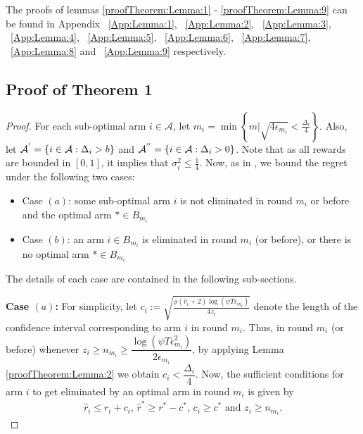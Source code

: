 The proofs of lemmas \ref{proofTheorem:Lemma:1} - \ref{proofTheorem:Lemma:9} can be found in Appendix ~\ref{App:Lemma:1}, ~\ref{App:Lemma:2}, ~\ref{App:Lemma:3}, ~\ref{App:Lemma:4}, ~\ref{App:Lemma:5}, ~\ref{App:Lemma:6}, ~\ref{App:Lemma:7}, ~\ref{App:Lemma:8} and ~\ref{App:Lemma:9} respectively.


\subsection*{Proof of Theorem 1}
\label{sec:proofTheorem:Theorem1}
\begin{proof}
For each sub-optimal arm ${i}\in\mathcal{A}$, let $m_{i}=\min{\left\lbrace m|\sqrt{4\epsilon_{m_i}} < \frac{\Delta_{i}}{4}\right\rbrace}$. Also, let $\mathcal{A}^{'}=\lbrace i\in \mathcal{A}: \Delta_{i} > b \rbrace$ and $\mathcal{A}^{''}=\lbrace i\in \mathcal{A}: \Delta_{i} > 0 \rbrace$. Note that as all rewards are bounded in $[0,1]$, it implies that $\sigma_i^2 \leq \frac{1}{4}$. Now, as in \cite{auer2010ucb}, we bound the regret under the following two cases: 
\begin{itemize}
\item {Case $(a)$}: some sub-optimal arm ${i}$ is not eliminated in round $m_{i}$ or before and the optimal arm ${*}\in B_{m_{i}}$
\item {Case $(b)$}: an arm ${i}\in B_{m_i}$ is eliminated in round $m_{i}$ (or before), or there is no optimal arm $*\in B_{m_i}$
\end{itemize} 
The details of each case are contained in the following sub-sections.


\textbf{Case $(a)$:}
For simplicity, let $c_{i} := \sqrt{\frac{\rho (\hat{v}_i + 2) \log (\psi T\epsilon_{m_{i}})}{4 z_{i}}}$ denote the length of the confidence interval corresponding to arm $i$ in round $m_i$. Thus, in round $m_i$ (or before) whenever $z_i \geq n_{m_{i}}\ge\dfrac{\log{(\psi T\epsilon_{m_{i}}^{2})}}{2\epsilon_{m_{i}}}$, by applying Lemma \ref{proofTheorem:Lemma:2} we obtain $c_{i} < \dfrac{\Delta_{i}}{4}$.
Now, the sufficient conditions for arm $i$ to get eliminated by an optimal arm in round $m_i$ is given by
	\begin{eqnarray}
	\hat{r}_{i} \leq r_{i} + c_{i} \text{, } \label{eq:armelim-casea}
 	\hat{r}^{*} \geq r^{*} - c^{*} \text{, } c_{i} \geq c^* \text{ and } z_i \geq n_{m_i} .
	\end{eqnarray}


\end{proof}
